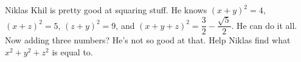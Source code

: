 Niklas Khil is pretty good at squaring stuff. He knows $(x + y)^2 = 4$, $(x + z)^2 = 5$, $(z + y)^2 = 9$, and $(x + y + z)^2 = \dfrac{3}{2} - \dfrac{\sqrt5}{2}$. He can do it all. Now adding three numbers? He's not so good at that. Help Niklas find what $x^2 + y^2 + z^2$ is equal to.
